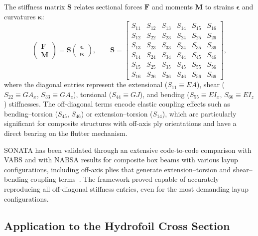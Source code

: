 The stiffness matrix $\mathbf{S}$ relates sectional forces $\mathbf{F}$ and moments $\mathbf{M}$
to strains $\boldsymbol{\epsilon}$ and curvatures $\boldsymbol{\kappa}$:
\begin{equation}
    \begin{pmatrix}\mathbf{F}\\\mathbf{M}\end{pmatrix}
    =
    \mathbf{S}
    \begin{pmatrix}\boldsymbol{\epsilon}\\\boldsymbol{\kappa}\end{pmatrix},
    \qquad
    \mathbf{S} =
    \begin{bmatrix}
        S_{11} & S_{12} & S_{13} & S_{14} & S_{15} & S_{16} \\
        S_{12} & S_{22} & S_{23} & S_{24} & S_{25} & S_{26} \\
        S_{13} & S_{23} & S_{33} & S_{34} & S_{35} & S_{36} \\
        S_{14} & S_{24} & S_{34} & S_{44} & S_{45} & S_{46} \\
        S_{15} & S_{25} & S_{35} & S_{45} & S_{55} & S_{56} \\
        S_{16} & S_{26} & S_{36} & S_{46} & S_{56} & S_{66}
    \end{bmatrix},
    \label{eq:timoshenko_stiffness}
\end{equation}
where the diagonal entries represent the extensional ($S_{11}\equiv EA$), shear
($S_{22}\equiv GA_x$, $S_{33}\equiv GA_z$), torsional ($S_{44}\equiv GJ$), and bending
($S_{55}\equiv EI_x$, $S_{66}\equiv EI_z$) stiffnesses.
The off-diagonal terms encode elastic coupling effects such as bending--torsion ($S_{45}$,
$S_{46}$) or extension--torsion ($S_{14}$), which are particularly significant for composite
structures with off-axis ply orientations and have a direct bearing on the flutter mechanism.

SONATA has been validated through an extensive code-to-code comparison with VABS and with
NABSA results for composite box beams with various layup configurations, including off-axis
plies that generate extension--torsion and shear--bending coupling
terms~\cite{feil2020sonata}.
The framework proved capable of accurately reproducing all off-diagonal stiffness entries,
even for the most demanding layup configurations.

\subsection{Application to the Hydrofoil Cross Section}

